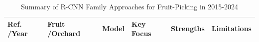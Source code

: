 \documentclass{ieeeaccess}
\begin{document}
\begin{table}[!htb]
\begin{tabular}{p{}p{}p{}p{}p{}p{}}
		\bottomrule
	\end{tabular}
\end{table}

\begin{table}[!htb]
	\centering
	\small
	\renewcommand{\arraystretch}{1.3}
	\addtocounter{table}{-1}
	\caption{Summary of R-CNN Family Approaches for Fruit-Picking in 2015-2024} 
	\begin{tabular}{p{}p{}p{}p{}p{}p{}}
	\toprule
	\textbf{Ref. \newline /Year} & \textbf{Fruit \newline /Orchard} & \textbf{Model} & 			\textbf{Key Focus} & \textbf{Strengths} & \textbf{Limitations} \\ \midrule


\end{tabular}
\end{table}
\end{document}
